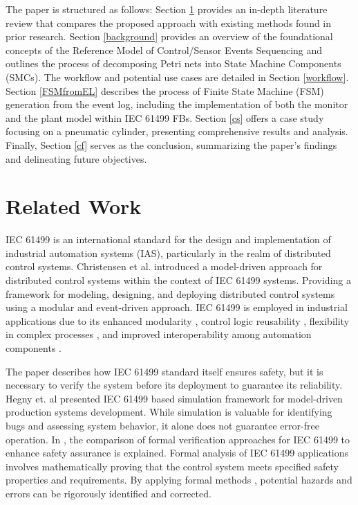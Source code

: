 \begin{bibunit}
The paper is structured as follows:  Section \ref{rw} provides an in-depth literature review that compares the proposed approach with existing methods found in prior research. Section \ref{background} provides an overview of the foundational concepts of the Reference Model of Control/Sensor Events Sequencing and outlines the process of decomposing Petri nets into State Machine Components (SMCs). The workflow and potential use cases are detailed in Section \ref{workflow}. Section \ref{FSMfromEL} describes the process of Finite State Machine (FSM) generation from the event log, including the implementation of both the monitor and the plant model within IEC 61499 FBs. Section \ref{cs} offers a case study focusing on a pneumatic cylinder, presenting comprehensive results and analysis. Finally, Section \ref{cf} serves as the conclusion, summarizing the paper's findings and delineating future objectives.


\section{Related Work }
\label{rw}
\hfill 

IEC 61499 \cite{iec61499part12012} is an international standard for the design and implementation of industrial automation systems (IAS), particularly in the realm of distributed control systems.  Christensen et al. \cite{christensen2000design} introduced a model-driven approach for distributed control systems within the context of IEC 61499 systems. Providing a framework for modeling, designing, and deploying distributed control systems using a modular and event-driven approach. IEC 61499 is employed in industrial applications due to its enhanced modularity \cite{thramboulidis2013iec}, control logic reusability \cite{hegny2012towards}, flexibility in complex processes \cite{dai2015bridging}, and improved interoperability among automation components \cite{sunder2006usability}.

The paper \cite{vyatkin2009iec} describes how IEC 61499 standard itself ensures safety, but it is necessary to verify the system before its deployment to guarantee its reliability.  Hegny et. al \cite{hegny2010iec} presented  IEC 61499 based simulation framework for model-driven production systems development. While simulation is valuable for identifying bugs and assessing system behavior, it alone does not guarantee error-free operation. In \cite{blech2016comparison},  the comparison of formal verification approaches for IEC 61499 to enhance safety assurance is explained. Formal analysis of IEC 61499 applications \cite{cengic2010formal1, cengic2010formal2 } involves mathematically proving that the control system meets specified safety properties and requirements. By applying formal methods \cite{schnakenbourg2002towards,yoong2010modelling}, potential hazards and errors can be rigorously identified and corrected.




\end{bibunit}
